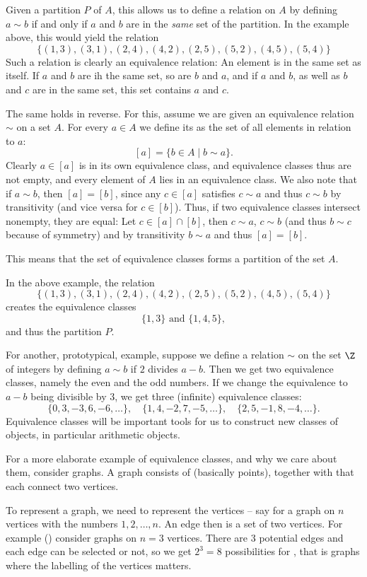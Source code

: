 Given a partition $P$ of $A$, this allows us to define a relation on $A$ by
defining $a\sim b$ if and only if $a$ and $b$ are in the {\em same} set of
the partition. In the example above, this would yield the relation
\[
\{(1,3),(3,1),(2,4),(4,2),(2,5),(5,2),(4,5),(5,4)\}
\]
Such a relation is clearly an equivalence relation: An element is in the
same set as itself. If $a$ and $b$ are ih the same set, so are $b$ and $a$,
and if $a$ and $b$, as well as $b$ and $c$ are in the same set, this set
contains $a$ and $c$.

The same holds in reverse. For this, assume we are given an equivalence
relation $\sim$ on a set $A$. For every $a\in A$ we 
define its  as the set of all elements in relation
to $a$:
\[
[a]=\{b\in A\mid b\sim a\}.
\]
Clearly $a\in[a]$ is in its own equivalence class, and equivalence classes
thus are not empty, and every element of $A$ lies in an equivalence class.
We also note that if $a\sim b$, then $[a]=[b]$, since any $c\in[a]$
satisfies $c\sim a$ and thus $c\sim b$ by transitivity (and vice versa for
$c\in[b]$). Thus, if two equivalence classes intersect nonempty, they are
equal: Let $c\in [a]\cap [b]$, then $c\sim a$, $c\sim b$ (and thus $b\sim c$
because of symmetry) and by transitivity $b\sim a$ and thus $[a]=[b]$.

This means that the set of equivalence classes forms a partition of the set
$A$.

In the above example, the relation 
\[
\{(1,3),(3,1),(2,4),(4,2),(2,5),(5,2),(4,5),(5,4)\}
\]
creates the equivalence classes
\[
\{1,3\}\mbox{\ and\ }\{1,4,5\},
\] and thus the partition $P$.

For another, prototypical, example, suppose we define a relation $\sim$ on the set $\Z$ of
integers by defining $a\sim b$ if $2$ divides $a-b$. Then we get two
equivalence classes, namely the even and the odd numbers. If we change the
equivalence to $a-b$ being divisible by $3$, we get three
(infinite) equivalence classes:
\[
\{0,3,-3,6,-6,\ldots\},\quad
\{1,4,-2,7,-5,\ldots\},\quad
\{2,5,-1,8,-4,\ldots\}.
\]
Equivalence classes will be important tools for us to construct new classes
of objects, in particular arithmetic objects.

For a more elaborate example of equivalence classes, and why we care about
them, consider graphs. A graph consists of  (basically
points), together with  that each connect two vertices.

To represent a graph, we need to represent the vertices -- say for a graph
on $n$ vertices with the numbers $1,2,\ldots,n$. An edge then is a set of
two vertices. For example () consider graphs on $n=3$
vertices. There are 3 potential edges and each edge can be selected or not,
so we get $2^3=8$ possibilities for , that is graphs
where the labelling of the vertices matters.


